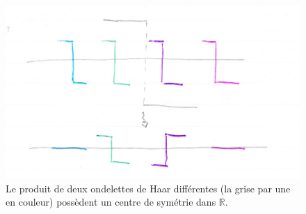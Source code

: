 	\begin{figure}[h]
		\centering
		\includegraphics[width=350pt]{Pierre/Haar_exemple.png}
		\caption{Le produit de deux ondelettes de Haar différentes  (la grise par une en couleur) possèdent un centre de symétrie dans $\mathbb{R}$.}
	\end{figure}
	
